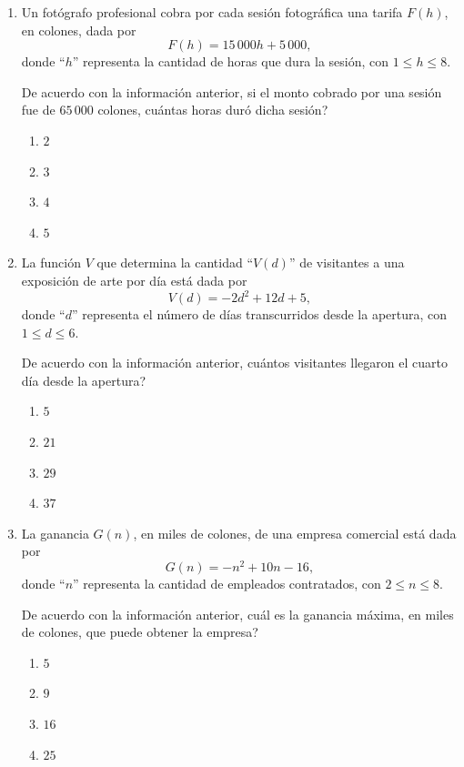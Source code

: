 \documentclass[11pt]{article}
\newcommand{\opcion}[2]{\item $#2$}
\begin{document}
\begin{enumerate}[label=\textbf{\arabic*.}, itemsep=2.5cm]
\Needspace{0.42\textheight}
\item
Un fot\'ografo profesional cobra por cada sesi\'on fotogr\'afica una tarifa $F(h)$, en colones, dada por
\[F(h) = 15\,000h + 5\,000,\]
donde ``$h$'' representa la cantidad de horas que dura la sesi\'on, con $1 \leq h \leq 8$.

De acuerdo con la informaci\'on anterior, si el monto cobrado por una sesi\'on fue de $65\,000$ colones, \textquestiondown cu\'antas horas dur\'o dicha sesi\'on?

\begin{enumerate}[label=\Alph*)]
  \item $2$
  \item $3$
  \opcion{C}{4}
  \item $5$
\end{enumerate}

\Needspace{0.42\textheight}
\item
La funci\'on $V$ que determina la cantidad ``$V(d)$'' de visitantes a una exposici\'on de arte por d\'ia est\'a dada por
\[V(d) = -2d^2 + 12d + 5,\]
donde ``$d$'' representa el n\'umero de d\'ias transcurridos desde la apertura, con $1 \leq d \leq 6$.

De acuerdo con la informaci\'on anterior, \textquestiondown cu\'antos visitantes llegaron el cuarto d\'ia desde la apertura?

\begin{enumerate}[label=\Alph*)]
  \item $5$
  \opcion{B}{21}
  \item $29$
  \item $37$
\end{enumerate}

\Needspace{0.42\textheight}
\item
La ganancia $G(n)$, en miles de colones, de una empresa comercial est\'a dada por
\[G(n) = -n^2 + 10n - 16,\]
donde ``$n$'' representa la cantidad de empleados contratados, con $2 \leq n \leq 8$.

De acuerdo con la informaci\'on anterior, \textquestiondown cu\'al es la ganancia m\'axima, en miles de colones, que puede obtener la empresa?

\begin{enumerate}[label=\Alph*)]
  \item $5$
  \opcion{B}{9}
  \item $16$
  \item $25$
\end{enumerate}


\end{enumerate}
\end{document}
